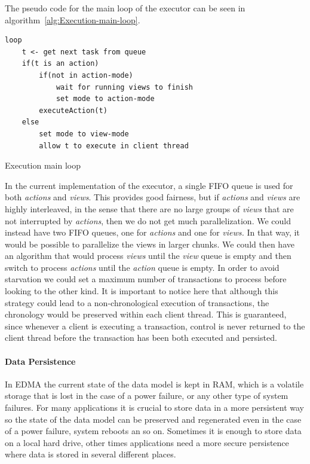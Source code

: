The pseudo code for the main loop of the executor can be seen in algorithm~\ref{alg:Execution-main-loop}.

\begin{algorithm}[H]
\begin{lstlisting}[tabsize=4]
loop
	t <- get next task from queue
	if(t is an action)
		if(not in action-mode)
			wait for running views to finish
			set mode to action-mode
		executeAction(t)
	else
		set mode to view-mode
		allow t to execute in client thread
\end{lstlisting}


\caption{\label{alg:Execution-main-loop}Execution main loop}
\end{algorithm}


In the current implementation of the executor, a single FIFO queue
is used for both \emph{actions} and \emph{views}. This provides good
fairness, but if \emph{actions} and \emph{views} are highly interleaved,
in the sense that there are no large groups of \emph{views} that are
not interrupted by \emph{actions}, then we do not get much parallelization.
We could instead have two FIFO queues, one for \emph{actions} and
one for \emph{views.} In that way, it would be possible to parallelize
the views in larger chunks. We could then have an algorithm that would
process \emph{views} until the \emph{view} queue is empty and then
switch to process \emph{actions} until the \emph{action} queue is
empty. In order to avoid starvation we could set a maximum number
of transactions to process before looking to the other kind. It is
important to notice here that although this strategy could lead to
a non-chronological execution of transactions, the chronology would
be preserved within each client thread. This is guaranteed, since
whenever a client is executing a transaction, control is never returned
to the client thread before the transaction has been both executed
and persisted.


\paragraph{\label{sub:Persistence}Data Persistence}

In EDMA the current state of the data model is kept in RAM, which
is a volatile storage that is lost in the case of a power failure,
or any other type of system failures. For many applications it is
crucial to store data in a more persistent way so the state of the
data model can be preserved and regenerated even in the case of a
power failure, system reboots an so on. Sometimes it is enough to
store data on a local hard drive, other times applications need a
more secure persistence where data is stored in several different
places.

